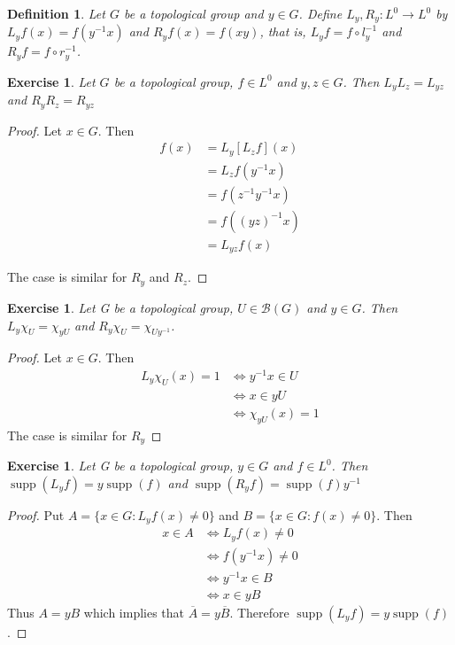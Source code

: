 \documentclass[12pt]{amsart}
\newtheorem{defn}[thm]{Definition}
\newtheorem{ex}[thm]{Exercise}
\DeclareMathOperator{\supp}{supp}
\newcommand{\MB}{\mathcal{B}}
\begin{document}
	\begin{defn}
		Let $G$ be a topological group and $y \in G$. Define $L_y, R_y: L^0 \rightarrow L^0$ by $L_yf(x) = f(y^{-1}x)$ and $R_yf(x) = f(xy)$, that is, $L_y f = f \circ l_y^{-1}$ and $R_y f = f \circ r_y^{-1}$.
	\end{defn}
	
	\begin{ex}
		Let $G$ be a topological group, $f \in L^0$ and $y,z \in G$. Then $L_yL_z = L_{yz}$ and $R_yR_z = R_{yz}$
	\end{ex}

	\begin{proof}
		Let $x \in G$. Then 
		\begin{align*}
			[L_yL_z]f(x)
			& = L_y [L_z f] (x) \\
			& = L_zf (y^{-1}x) \\
			& = f(z^{-1}y^{-1}x) \\
			& = f((yz)^{-1}x) \\
			& = L_{yz}f (x)
		\end{align*}
		
		The case is similar for $R_y$ and $ R_z$.
	\end{proof}
	
	\begin{ex}
		Let G be a topological group, $U \in \MB(G)$ and $y \in G$. Then $L_y\chi_U = \chi_{yU}$ and $R_y\chi_U = \chi_{Uy^{-1}}$. 
	\end{ex}
	
	\begin{proof}
		Let $x \in G$. Then 
		\begin{align*}
			L_y\chi_U(x) = 1
			& \iff y^{-1}x \in U\\
			& \iff x \in yU \\
			& \iff \chi_{yU}(x) = 1
		\end{align*}
		The case is similar for $R_y$
	\end{proof}
	
	\begin{ex}
		Let G be a topological group, $y \in G$ and $f \in L^0$. Then $\supp(L_yf) = y\supp(f)$ and $\supp(R_yf) = \supp(f)y^{-1}$
	\end{ex}
	
	\begin{proof}
		Put $A = \{x \in G: L_yf(x) \neq 0 \}$ and $B = \{x \in G: f(x) \neq 0 \}$. Then 
		\begin{align*}
			x \in A
			& \iff L_yf(x) \neq 0 \\
			& \iff f(y^{-1}x) \neq 0 \\
			& \iff y^{-1}x \in B \\
			& \iff x \in yB
		\end{align*}
		Thus $A = yB$ which implies that $\overline{A} = y\overline{B}$. Therefore $\supp(L_yf) = y\supp(f)$.
	\end{proof}
	
\end{document}
